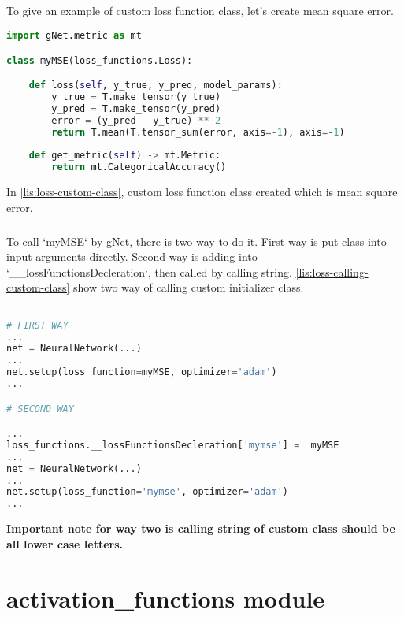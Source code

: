 \documentclass[12pt]{report}
\begin{document}
\paragraph{}
To give an example of custom loss function class, let's create mean square error. 


\begin{lstlisting}[language=Python, numbers=none, caption={Custom loss function class.}, label={lis:loss-custom-class}]
import gNet.metric as mt

class myMSE(loss_functions.Loss):

	def loss(self, y_true, y_pred, model_params):  
		y_true = T.make_tensor(y_true)
		y_pred = T.make_tensor(y_pred)
		error = (y_pred - y_true) ** 2
		return T.mean(T.tensor_sum(error, axis=-1), axis=-1)
	
	def get_metric(self) -> mt.Metric:
		return mt.CategoricalAccuracy()

\end{lstlisting}

In \ref{lis:loss-custom-class}, custom loss function class created which is mean square error. 

\paragraph{}
To call `myMSE` by gNet, there is two way to do it. First way is put class into input arguments directly. Second way is adding into  `\_\_lossFunctionsDecleration`, then called by calling string. \ref{lis:loss-calling-custom-class} show two way of calling custom initializer class.

\begin{lstlisting}[language=Python, numbers=none, caption={Calling custom loss function class.}, label={lis:loss-calling-custom-class}]

# FIRST WAY
...
net = NeuralNetwork(...)
...
net.setup(loss_function=myMSE, optimizer='adam')
...

# SECOND WAY

...
loss_functions.__lossFunctionsDecleration['mymse'] =  myMSE
...
net = NeuralNetwork(...)
...
net.setup(loss_function='mymse', optimizer='adam')
...

\end{lstlisting}

\textbf{Important note for way two is calling string of custom class should be all lower case letters. }




\chapter{activation\_functions module}
\end{document}
